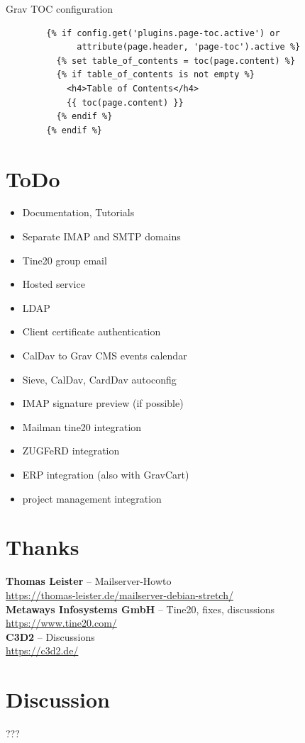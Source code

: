\documentclass{beamer}
\begin{document}
\begin{frame}[fragile]{\insertsection}{\insertsubsection}
	Grav TOC configuration
	\begin{verbatim}
		{% if config.get('plugins.page-toc.active') or
		      attribute(page.header, 'page-toc').active %}
		  {% set table_of_contents = toc(page.content) %}
		  {% if table_of_contents is not empty %}
			<h4>Table of Contents</h4>
			{{ toc(page.content) }}
		  {% endif %}
		{% endif %}
	\end{verbatim}
\end{frame}

\section{ToDo}
\begin{frame}[fragile]{\insertsection}{\insertsubsection}
	\begin{itemize}
		\item Documentation, Tutorials
		\item Separate IMAP and SMTP domains
		\item Tine20 group email
		\item Hosted service
		\item LDAP
		\item Client certificate authentication
		\item CalDav to Grav CMS events calendar
		\item Sieve, CalDav, CardDav autoconfig
		\item IMAP signature preview (if possible)
		\item Mailman tine20 integration
		\item ZUGFeRD integration
		\item ERP integration (also with GravCart)
		\item project management integration
	\end{itemize}
\end{frame}

\section{Thanks}
\begin{frame}[fragile]{\insertsection}{\insertsubsection}
	\textbf{Thomas Leister} -- Mailserver-Howto\\
	\url{https://thomas-leister.de/mailserver-debian-stretch/}\\
	\textbf{Metaways Infosystems GmbH} -- Tine20, fixes, discussions\\
	\url{https://www.tine20.com/} \\
	\textbf{C3D2} -- Discussions\\
	\url{https://c3d2.de/} \\


\end{frame}

\section{Discussion}
\begin{frame}[fragile]{\insertsection}{\insertsubsection} %
  \Huge{???}	
\end{frame}	
\end{document}
